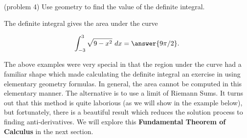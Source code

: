 \documentclass[handout]{ximera}
\begin{document}
\begin{example}[example 4]
\begin{image}
\end{image}



\end{example}

\begin{problem}(problem 4)
Use geometry to find the value of the definite integral.
\begin{hint}
The definite integral gives the area under the curve
\end{hint}
\[\int_{-3}^{3} \sqrt{9-x^2} \ dx = \answer{9\pi/2}.\]
\end{problem}


The above examples were very special in that the region under the curve had a familiar shape which
made calculating the definite integral an exercise in using elementary geometry formulas. 
In general, the area cannot be computed in this elementary manner.  
The alternative is to use a limit of Riemann Sums.  It turns out that this method is quite laborious (as we will show in the example below), but 
fortunately, there is a beautiful result which reduces the solution process to finding anti-derivatives. 
We will explore this \textbf{Fundamental Theorem of Calculus} in the next section.
\end{document}
